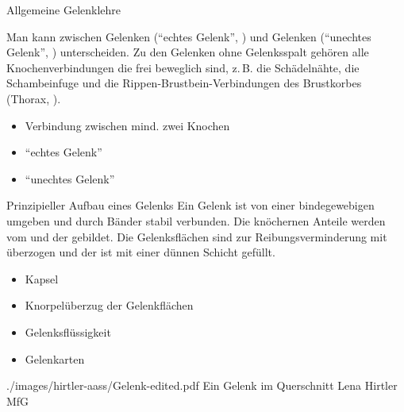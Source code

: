 \TextSlide
{Allgemeine Gelenklehre}
{ Man kann zwischen Gelenken  (\protect\enquote{echtes Gelenk},
) und Gelenken 
(\protect\enquote{unechtes Gelenk}, )
unterscheiden.
%
Zu den Gelenken ohne Gelenksspalt gehören alle
Knochenverbindungen die  frei beweglich sind,
z.\,B. die Schädelnähte, 
die Schambeinfuge 
und die Rippen-Brustbein-Verbindungen des Brustkorbes 
(Thorax, ).%




}
{%
\begin{itemize}
  \item Verbindung zwischen
  mind. zwei Knochen
  \item \protect\enquote{echtes Gelenk}
  \item \protect\enquote{unechtes Gelenk}
\end{itemize}
}{}{}{}

\begin{Synopsis}
\end{Synopsis}



\TextSlidePicture
{Prinzipieller Aufbau eines Gelenks}%
{%
Ein Gelenk ist von einer bindegewebigen  umgeben
und durch Bänder stabil verbunden.
%
Die knöchernen Anteile werden 
vom 
und der 
gebildet.
%
Die Gelenksflächen sind zur Reibungs\-ver\-minderung mit 
 überzogen und der  ist mit
einer dünnen Schicht 
 gefüllt. 
}%
{%
\begin{itemize}
  \item Kapsel
  \item Knorpelüberzug der Gelenkflächen
  \item Gelenksflüssigkeit
  \item Gelenkarten
\end{itemize}}%
{./images/hirtler-aass/Gelenk-edited.pdf}%
{Ein Gelenk im Querschnitt}%
{}%
{Lena Hirtler}%
{MfG}%


